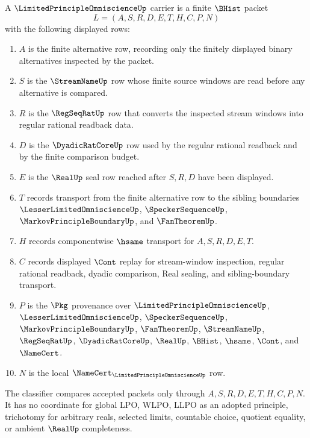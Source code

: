 \begin{definition}
\label{def:limited-principle-omniscience-carrier}
A $\LimitedPrincipleOmniscienceUp$ carrier is a finite $\BHist$ packet
$$
L=(A,S,R,D,E,T,H,C,P,N)
$$
with the following displayed rows:
\begin{enumerate}
\item $A$ is the finite alternative row, recording only the finitely displayed binary alternatives inspected by the packet.
\item $S$ is the $\StreamNameUp$ row whose finite source windows are read before any alternative is compared.
\item $R$ is the $\RegSeqRatUp$ row that converts the inspected stream windows into regular rational readback data.
\item $D$ is the $\DyadicRatCoreUp$ row used by the regular rational readback and by the finite comparison budget.
\item $E$ is the $\RealUp$ seal row reached after $S,R,D$ have been displayed.
\item $T$ records transport from the finite alternative row to the sibling boundaries $\LesserLimitedOmniscienceUp$, $\SpeckerSequenceUp$, $\MarkovPrincipleBoundaryUp$, and $\FanTheoremUp$.
\item $H$ records componentwise $\hsame$ transport for $A,S,R,D,E,T$.
\item $C$ records displayed $\Cont$ replay for stream-window inspection, regular rational readback, dyadic comparison, Real sealing, and sibling-boundary transport.
\item $P$ is the $\Pkg$ provenance over $\LimitedPrincipleOmniscienceUp$, $\LesserLimitedOmniscienceUp$, $\SpeckerSequenceUp$, $\MarkovPrincipleBoundaryUp$, $\FanTheoremUp$, $\StreamNameUp$, $\RegSeqRatUp$, $\DyadicRatCoreUp$, $\RealUp$, $\BHist$, $\hsame$, $\Cont$, and $\NameCert$.
\item $N$ is the local $\NameCert_{\LimitedPrincipleOmniscienceUp}$ row.
\end{enumerate}
The classifier compares accepted packets only through $A,S,R,D,E,T,H,C,P,N$. It has no coordinate for global LPO, WLPO, LLPO as an adopted principle, trichotomy for arbitrary reals, selected limits, countable choice, quotient equality, or ambient $\RealUp$ completeness.
\end{definition}

